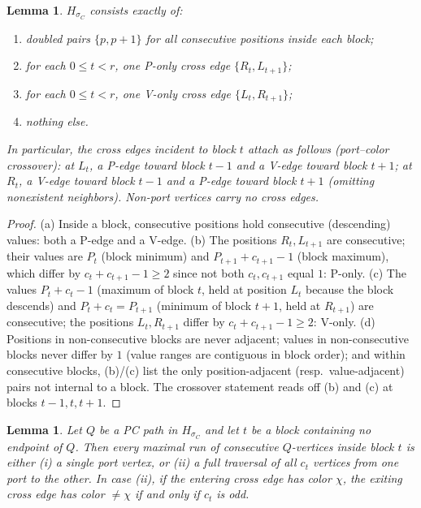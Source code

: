 \documentclass[11pt]{article}
\newtheorem{lemma}[theorem]{Lemma}
\theoremstyle{definition}
\begin{document}
\begin{lemma}\label{lem:chain-inv}
$H_{\sigma_C}$ consists exactly of:
\begin{enumerate}
\item[(a)] doubled pairs $\{p, p+1\}$ for all consecutive positions inside each
block;
\item[(b)] for each $0 \le t < r$, one P-only cross edge $\{R_t, L_{t+1}\}$;
\item[(c)] for each $0 \le t < r$, one V-only cross edge $\{L_t, R_{t+1}\}$;
\item[(d)] nothing else.
\end{enumerate}
In particular, the cross edges incident to block $t$ attach as follows
(\emph{port--color crossover}): at $L_t$, a P-edge toward block $t-1$ and a V-edge
toward block $t+1$; at $R_t$, a V-edge toward block $t-1$ and a P-edge toward
block $t+1$ (omitting nonexistent neighbors). Non-port vertices carry no cross
edges.
\end{lemma}

\begin{proof}
(a) Inside a block, consecutive positions hold consecutive (descending) values:
both a P-edge and a V-edge. (b) The positions $R_t, L_{t+1}$ are consecutive;
their values are $P_t$ (block minimum) and $P_{t+1} + c_{t+1} - 1$ (block
maximum), which differ by $c_t + c_{t+1} - 1 \ge 2$ since not both $c_t, c_{t+1}$
equal $1$: P-only. (c) The values $P_t + c_t - 1$ (maximum of block $t$, held at
position $L_t$ because the block descends) and $P_t + c_t = P_{t+1}$ (minimum of
block $t+1$, held at $R_{t+1}$) are consecutive; the positions $L_t, R_{t+1}$
differ by $c_t + c_{t+1} - 1 \ge 2$: V-only. (d) Positions in non-consecutive
blocks are never adjacent; values in non-consecutive blocks never differ by $1$
(value ranges are contiguous in block order); and within consecutive blocks,
(b)/(c) list the only position-adjacent (resp.\ value-adjacent) pairs not internal
to a block. The crossover statement reads off (b) and (c) at blocks $t-1, t, t+1$.
\end{proof}

\begin{lemma}\label{lem:chain-visit}
Let $Q$ be a PC path in $H_{\sigma_C}$ and let $t$ be a block containing no
endpoint of $Q$. Then every maximal run of consecutive $Q$-vertices inside block
$t$ is either (i) a single port vertex, or (ii) a \emph{full traversal} of all
$c_t$ vertices from one port to the other. In case (ii), if the entering cross
edge has color $\chi$, the exiting cross edge has color $\ne \chi$ if and only if
$c_t$ is odd.
\end{lemma}
\end{document}
